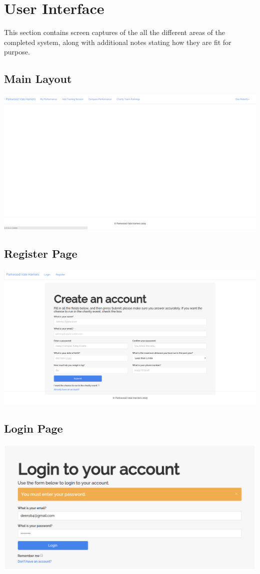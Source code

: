 \documentclass{article}[12pt,a4paper]
\begin{document}
\section{User Interface}
This section contains screen captures of the all the different areas of the completed system, along with additional notes stating how they are fit for purpose.

\subsection{Main Layout}
\includegraphics[scale=0.24]{final_ui/layout}

\subsection{Register Page}
\includegraphics[scale=0.22]{final_ui/register}

\subsection{Login Page}
\includegraphics[scale=0.35]{final_ui/login}
\end{document}
